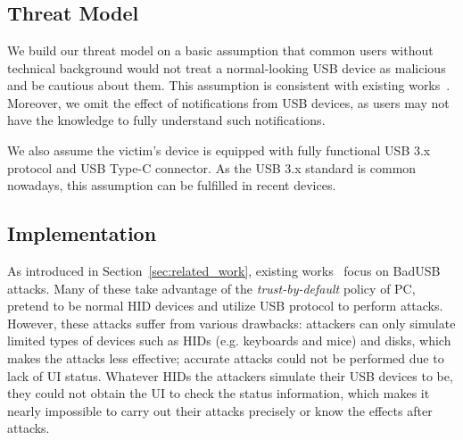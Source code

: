 \section{\tool}
\label{sec:badusb}
\subsection{Threat Model}

We build our threat model on a basic assumption that common users without
technical background would not treat a normal-looking \ac{USB} device as malicious and be cautious about them. This assumption is consistent with existing works~\cite{JFCImpact}. Moreover, we omit the
effect of notifications from \ac{USB} devices, as users may not have the knowledge to fully understand such notifications.

We also assume the victim's device is equipped with fully functional \ac{USB} 3.x
protocol and \ac{USB} Type-C connector. As the \ac{USB} 3.x standard is
common nowadays, this assumption can be fulfilled in recent
devices.


\subsection{Implementation}

As introduced in Section~\ref{sec:related_work},
existing works~\cite{rubber,badusb,
rubberducky2020,usbbypassing,iseeyou,usbdriver} focus on BadUSB attacks.
Many of these take advantage of the \textit{trust-by-default} policy of PC,
pretend to be normal \ac{HID} devices and utilize \ac{USB} protocol to perform attacks.
However, these attacks suffer from various drawbacks:  attackers can
only simulate limited types of devices such as \acp{HID} (e.g. keyboards and mice)
and disks, which makes the attacks less effective;  accurate attacks
could not be performed due to lack of \ac{UI} status. Whatever \acp{HID} the
attackers simulate their \ac{USB} devices to be, they could not obtain the \ac{UI} to
check the status information, which makes it nearly impossible to carry out
their attacks precisely or know the effects after attacks.

